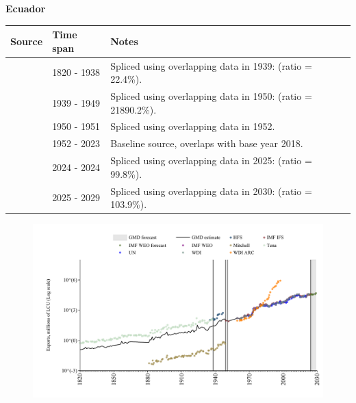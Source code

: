 \documentclass[12pt,a4paper,landscape]{article}
\begin{document}
\begin{adjustbox}{max totalsize={\paperwidth}{\paperheight},center}
\begin{minipage}[t][\textheight][t]{\textwidth}
\vspace*{0.5cm}
{}
\begin{center}
{\Large\bfseries Ecuador}
\end{center}
\vspace{0.5cm}
\begin{table}[H]
\centering
\small
\begin{tabular}{|l|l|l|}
\hline
\textbf{Source} & \textbf{Time span} & \textbf{Notes} \\
\hline
\rowcolor{white}\cite{Tena}& 1820 - 1938 &Spliced using overlapping data in 1939: (ratio = 22.4\%).\\
\rowcolor{lightgray}\cite{Mitchell}& 1939 - 1949 &Spliced using overlapping data in 1950: (ratio = 21890.2\%).\\
\rowcolor{white}\cite{IMF_IFS}& 1950 - 1951 &Spliced using overlapping data in 1952.\\
\rowcolor{lightgray}\cite{WDI}& 1952 - 2023 &Baseline source, overlaps with base year 2018.\\
\rowcolor{white}\cite{IMF_IFS}& 2024 - 2024 &Spliced using overlapping data in 2025: (ratio = 99.8\%).\\
\rowcolor{lightgray}\cite{IMF_WEO_forecast}& 2025 - 2029 &Spliced using overlapping data in 2030: (ratio = 103.9\%).\\
\hline
\end{tabular}
\end{table}
\begin{figure}[H]
\centering
\includegraphics[width=\textwidth,height=0.6\textheight,keepaspectratio]{graphs/ECU_exports.pdf}
\end{figure}
\end{minipage}
\end{adjustbox}
\end{document}
